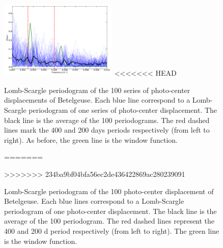 \documentclass{aa}
\begin{document}
\begin{figure}[!h]
    \centering
    \includegraphics[width=0.5\textwidth]{Lomb-Scargle Photo-center.pdf}
<<<<<<< HEAD
    \caption{Lomb-Scargle periodogram of the 100 series of photo-center displacements of Betelgeuse. Each blue line correspond to a Lomb-Scargle periodogram of one series of photo-center
     displacement. The black line is the average of the 100 periodograms. The red dashed lines mark the 400 and 200 days periods respectively 
     (from left to right). As before, the green line is the window function.}
=======
    \caption{Lomb-Scargle periodogram of the 100 photo-center displacement of Betelgeuse. Each blue lines correspond to a Lomb-Scargle periodogram of one photo-center
     displacement. The black line is the average of the 100 periodogram. The red dashed lines represent the 400 and 200 d period respectively 
     (from left to right). The green line is the window function.}
>>>>>>> 234ba9bf04bfa56ec2de436422869ac280239091
    \label{LS photocenter}
\end{figure}
\end{document}
